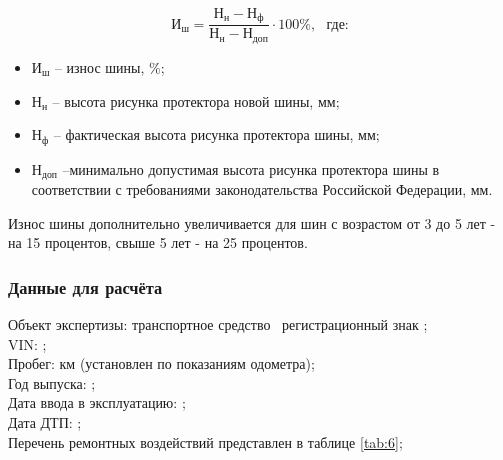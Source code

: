 \begin{equation}\label{eq:sh}
\text{И}_{\text{ш}} = \frac{\text{Н}_{\text{н}}-\text{Н}_{\text{ф}}}{\text{Н}_{\text{н}}-\text{Н}_{\text{доп}}} \cdot{100}\%,  \,\,\,\,\text{где:} 
\end{equation}
%
\begin{itemize}
	\item[ ] $ \text{И}_{\text{ш}} $ -- износ шины, \%;
	\item[ ] $ \text{Н}_{\text{н}} $ -- высота рисунка протектора новой шины, мм;
	\item[ ] $\text{Н}_{\text{ф}} $ -- фактическая высота рисунка протектора шины, мм;
	\item[ ] $ \text{Н}_{\text{доп}} $ --минимально допустимая высота рисунка протектора шины в соответствии с требованиями законодательства Российской Федерации, мм.
\end{itemize}
%
\vspace{5mm}
\relax
%
Износ шины дополнительно увеличивается для шин с возрастом от 3 до 5 лет - на 15 процентов, свыше 5 лет - на 25 процентов.

                                                 
\subsubsection{Данные для расчёта}

\noindent Объект экспертизы:  транспортное средство \tc\,
регистрационный знак ;\\ 
VIN: ;\\
Пробег:     км (установлен по показаниям одометра);\\
Год выпуска:     ;\\ 
Дата ввода в эксплуатацию:  ;\\
Дата ДТП:  ;\\
Перечень ремонтных воздействий представлен в таблице \ref{tab:6};\\
%
%
%   
%  
